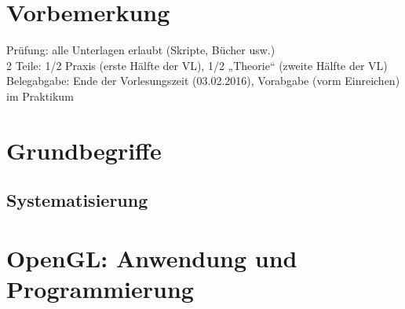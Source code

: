 \newcommand{\customDir}{../}








%



\maketitle
\newpage
\tableofcontents
\newpage

\chapter*{Vorbemerkung}
Prüfung: alle Unterlagen erlaubt (Skripte, Bücher usw.)\\
2 Teile: 1/2 Praxis (erste Hälfte der VL), 1/2 „Theorie“ (zweite Hälfte der VL)\\
Belegabgabe: Ende der Vorlesungszeit (03.02.2016), Vorabgabe (vorm Einreichen) im Praktikum
\chapter*{Grundbegriffe}
\section*{Systematisierung}

\chapter{OpenGL: Anwendung und Programmierung}
